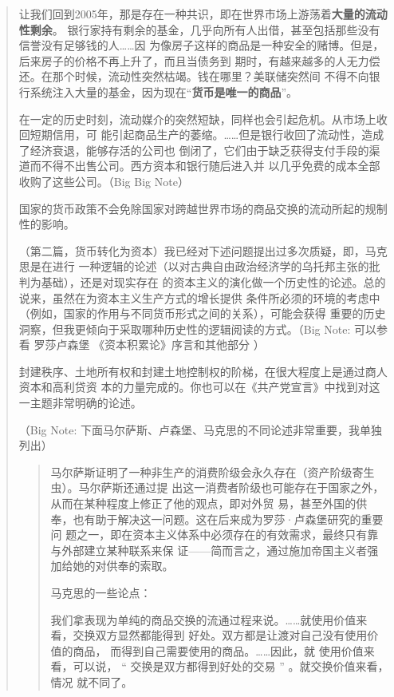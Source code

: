 \begin{quotation}
让我们回到2005年，那是存在一种共识，即在世界市场上游荡着\textbf{大量的流动性剩余}。
银行家持有剩余的基金，几乎向所有人出借，甚至包括那些没有信誉没有足够钱的人……因
为像房子这样的商品是一种安全的赌博。但是，后来房子的价格不再上升了，而且当债务到
期时，有越来越多的人无力偿还。在那个时候，流动性突然枯竭。钱在哪里？美联储突然间
不得不向银行系统注入大量的基金，因为现在“\textbf{货币是唯一的商品}”。 

在一定的历史时刻，流动媒介的突然短缺，同样也会引起危机。从市场上收回短期信用，可
能引起商品生产的萎缩。……但是银行收回了流动性，造成了经济衰退，能够存活的公司也
倒闭了，它们由于缺乏获得支付手段的渠道而不得不出售公司。西方资本和银行随后进入并
以几乎免费的成本全部收购了这些公司。（Big Big Note） 

国家的货币政策不会免除国家对跨越世界市场的商品交换的流动所起的规制性的影响。 

（第二篇，货币转化为资本）我已经对下述问题提出过多次质疑，即，马克思是在进行
一种逻辑的论述（以对古典自由政治经济学的乌托邦主张的批判为基础），还是对现实存在
的资本主义的演化做一个历史性的论述。总的说来，虽然在为资本主义生产方式的增长提供
条件所必须的环境的考虑中（例如，国家的作用与不同货币形式之间的关系），可能会获得
重要的历史洞察，但我更倾向于采取哪种历史性的逻辑阅读的方式。（Big Note: 可以参看
罗莎卢森堡 《资本积累论》序言和其他部分 ） 

封建秩序、土地所有权和封建土地控制权的阶梯，在很大程度上是通过商人资本和高利贷资
本的力量完成的。你也可以在《共产党宣言》中找到对这一主题非常明确的论述。

（Big Note: 下面马尔萨斯、卢森堡、马克思的不同论述非常重要，我单独列出）
\begin{quotation}
马尔萨斯证明了一种非生产的消费阶级会永久存在（资产阶级寄生虫）。马尔萨斯还通过提
出这一消费者阶级也可能存在于国家之外，从而在某种程度上修正了他的观点，即对外贸
易，甚至外国的供奉，也有助于解决这一问题。这在后来成为罗莎·卢森堡研究的重要问
题之一，即在资本主义体系中必须存在的有效需求，最终只有靠与外部建立某种联系来保
证——简而言之，通过施加帝国主义者强加给她的对供奉的索取。

\bigskip 马克思的一些论点：

我们拿表现为单纯的商品交换的流通过程来说。……就使用价值来看，交换双方显然都能得到
好处。双方都是让渡对自己没有使用价值的商品， 而得到自己需要使用的商品。……因此，就
使用价值来看，可以说， “ 交换是双方都得到好处的交易 ” 。就交换价值来看，情况
就不同了。 


\end{quotation}
\end{quotation}
